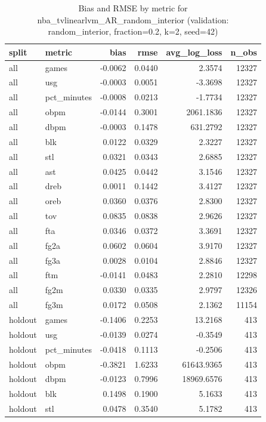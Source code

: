 \begin{table}
\caption{Bias and RMSE by metric for nba_tvlinearlvm_AR_random_interior (validation: random_interior, fraction=0.2, k=2, seed=42)}
\label{tab:nba_tvlinearlvm_AR_random_interior_vs_random_interior_f20_k2_s42_bias_rmse}
\begin{tabular}{llrrrr}
\toprule
split & metric & bias & rmse & avg\_log\_loss & n\_obs \\
\midrule
all & games & -0.0062 & 0.0440 & 2.3574 & 12327 \\
all & usg & -0.0003 & 0.0051 & -3.3698 & 12327 \\
all & pct\_minutes & -0.0008 & 0.0213 & -1.7734 & 12327 \\
all & obpm & -0.0144 & 0.3001 & 2061.1836 & 12327 \\
all & dbpm & -0.0003 & 0.1478 & 631.2792 & 12327 \\
all & blk & 0.0122 & 0.0329 & 2.3227 & 12327 \\
all & stl & 0.0321 & 0.0343 & 2.6885 & 12327 \\
all & ast & 0.0425 & 0.0442 & 3.1546 & 12327 \\
all & dreb & 0.0011 & 0.1442 & 3.4127 & 12327 \\
all & oreb & 0.0360 & 0.0376 & 2.8300 & 12327 \\
all & tov & 0.0835 & 0.0838 & 2.9626 & 12327 \\
all & fta & 0.0346 & 0.0372 & 3.3691 & 12327 \\
all & fg2a & 0.0602 & 0.0604 & 3.9170 & 12327 \\
all & fg3a & 0.0028 & 0.0104 & 2.8846 & 12327 \\
all & ftm & -0.0141 & 0.0483 & 2.2810 & 12298 \\
all & fg2m & 0.0330 & 0.0335 & 2.9797 & 12326 \\
all & fg3m & 0.0172 & 0.0508 & 2.1362 & 11154 \\
holdout & games & -0.1406 & 0.2253 & 13.2168 & 413 \\
holdout & usg & -0.0139 & 0.0274 & -0.3549 & 413 \\
holdout & pct\_minutes & -0.0418 & 0.1113 & -0.2506 & 413 \\
holdout & obpm & -0.3821 & 1.6233 & 61643.9365 & 413 \\
holdout & dbpm & -0.0123 & 0.7996 & 18969.6576 & 413 \\
holdout & blk & 0.1498 & 0.1900 & 5.1633 & 413 \\
holdout & stl & 0.0478 & 0.3540 & 5.1782 & 413 \\

\end{tabular}
\end{table}
